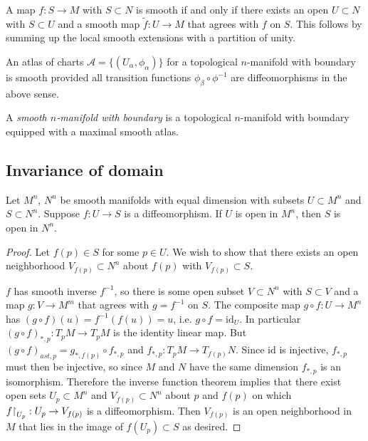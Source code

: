 \begin{remark}
A map $f: S \to M$ with $S \subset N$ is smooth if and only if there
exists an open $U \subset N$ with $S \subset U$ and a smooth map
$\tilde{f}: U \to M$ that agrees with $f$ on $S$. This follows by
summing up the local smooth extensions with a partition of unity.
\end{remark}

\begin{defn}
An atlas of charts $\mathcal{A} = \{(U_\alpha, \phi_\alpha)\}$ for a
topological $n$-manifold with boundary is smooth provided all
transition functions $\phi_\beta \circ \phi^{-1}$ are diffeomorphisms
in the above sense.

A \emph{smooth $n$-manifold with boundary} is a topological
$n$-manifold with boundary equipped with a maximal smooth atlas.
\end{defn}

\subsection{Invariance of domain}

\begin{theorem}
Let $M^n$, $N^n$ be smooth manifolds with equal dimension with subsets
$U \subset M^n$ and $S \subset N^n$. Suppose $f: U \to S$ is a
diffeomorphism. If $U$ is open in $M^n$, then $S$ is open in $N^n$.
\end{theorem}

\begin{proof}
Let $f(p) \in S$ for some $p \in U$. We wish to show that there exists
an open neighborhood $V_{f(p)} \subset N^n$ about $f(p)$ with
$V_{f(p)} \subset S$.

$f$ has smooth inverse $f^{-1}$, so there is some open subset
$V \subset N^n$ with $S \subset V$ and a map
$g: V \to M^m$ that agrees with $g = f^{-1}$ on $S$. The composite map
$g \circ f : U \to M^n$ has
$(g \circ f)(u) = f^{-1}(f(u)) = u$, i.e. $g \circ f =
\mathrm{id}_U$. In particular
$(g \circ f)_{\ast, p} : T_pM \to T_pM$ is the identity linear map.
But $(g \circ f)_{ast, p} = g_{\ast,f(p)} \circ f_{\ast, p}$ and
$f_{\ast, p} : T_p M \to T_{f(p)} N$. Since $\mathrm{id}$ is
injective, $f_{\ast, p}$ must then be injective, so since
$M$ and $N$ have the same dimension $f_{\ast,p}$ is an
isomorphism. Therefore the inverse function theorem implies that
there exist open sets $U_p \subset M^n$ and $V_{f(p)} \subset N^n$
about $p$ and $f(p)$ on which
$f\mathord{\upharpoonright}_{U_p} : U_p \to V_{f(p)}$ is a diffeomorphism. Then
$V_{f(p)}$ is an open neighborhood in $M$ that lies in the image of
$f(U_p) \subset S$ as desired.
\end{proof}


